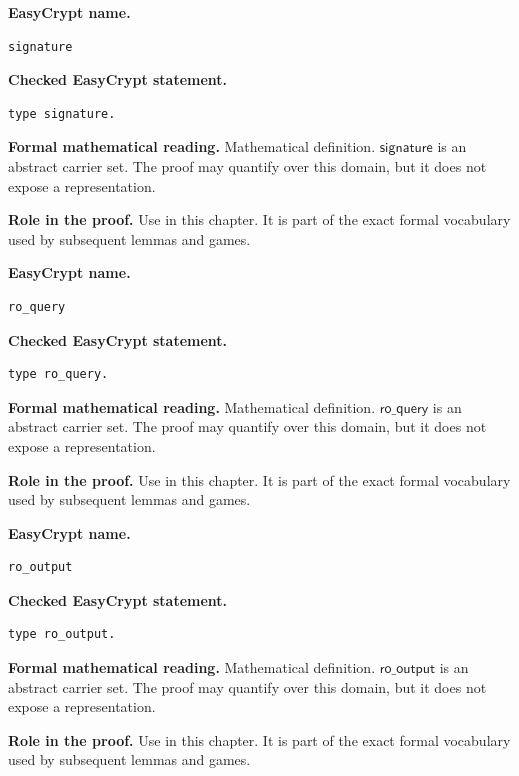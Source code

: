 \begin{formaldefinition}
\noindent\textbf{EasyCrypt name.}
\begin{lstlisting}[language=EasyCrypt,basicstyle=\ttfamily\scriptsize]
signature
\end{lstlisting}
\noindent\textbf{Checked EasyCrypt statement.}
\begin{lstlisting}[language=EasyCrypt,basicstyle=\ttfamily\scriptsize]
type signature.
\end{lstlisting}
\noindent\textbf{Formal mathematical reading.}
Mathematical definition. \(\mathsf{signature}\) is an abstract carrier set.  The proof may quantify over this domain, but it does not expose a representation.

\noindent\textbf{Role in the proof.}
Use in this chapter. It is part of the exact formal vocabulary used by subsequent lemmas and games.

\end{formaldefinition}

\begin{formaldefinition}
\noindent\textbf{EasyCrypt name.}
\begin{lstlisting}[language=EasyCrypt,basicstyle=\ttfamily\scriptsize]
ro_query
\end{lstlisting}
\noindent\textbf{Checked EasyCrypt statement.}
\begin{lstlisting}[language=EasyCrypt,basicstyle=\ttfamily\scriptsize]
type ro_query.
\end{lstlisting}
\noindent\textbf{Formal mathematical reading.}
Mathematical definition. \(\mathsf{ro\_query}\) is an abstract carrier set.  The proof may quantify over this domain, but it does not expose a representation.

\noindent\textbf{Role in the proof.}
Use in this chapter. It is part of the exact formal vocabulary used by subsequent lemmas and games.

\end{formaldefinition}

\begin{formaldefinition}
\noindent\textbf{EasyCrypt name.}
\begin{lstlisting}[language=EasyCrypt,basicstyle=\ttfamily\scriptsize]
ro_output
\end{lstlisting}
\noindent\textbf{Checked EasyCrypt statement.}
\begin{lstlisting}[language=EasyCrypt,basicstyle=\ttfamily\scriptsize]
type ro_output.
\end{lstlisting}
\noindent\textbf{Formal mathematical reading.}
Mathematical definition. \(\mathsf{ro\_output}\) is an abstract carrier set.  The proof may quantify over this domain, but it does not expose a representation.

\noindent\textbf{Role in the proof.}
Use in this chapter. It is part of the exact formal vocabulary used by subsequent lemmas and games.

\end{formaldefinition}

